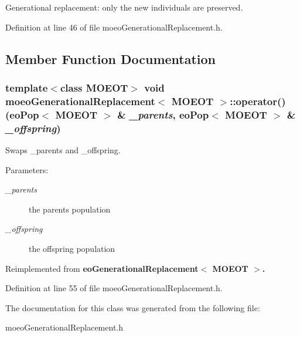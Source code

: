 Generational replacement: only the new individuals are preserved. 



Definition at line 46 of file moeo\-Generational\-Replacement.h.

\subsection{Member Function Documentation}
\subsubsection{\setlength{\rightskip}{0pt plus 5cm}template$<$class MOEOT$>$ void \bf{moeo\-Generational\-Replacement}$<$ MOEOT $>$::operator() (\bf{eo\-Pop}$<$ MOEOT $>$ \& {\em \_\-parents}, \bf{eo\-Pop}$<$ MOEOT $>$ \& {\em \_\-offspring})\hspace{0.3cm}{\tt  [inline]}}\label{classmoeoGenerationalReplacement_7b8ac20d375820ba44a9f3dd4b95e120}


Swaps \_\-parents and \_\-offspring. 

\begin{Desc}
\item[Parameters:]
\begin{description}
\item[{\em \_\-parents}]the parents population \item[{\em \_\-offspring}]the offspring population \end{description}
\end{Desc}


Reimplemented from \bf{eo\-Generational\-Replacement$<$ MOEOT $>$}.

Definition at line 55 of file moeo\-Generational\-Replacement.h.

The documentation for this class was generated from the following file:\begin{CompactItemize}
\item 
moeo\-Generational\-Replacement.h\end{CompactItemize}
